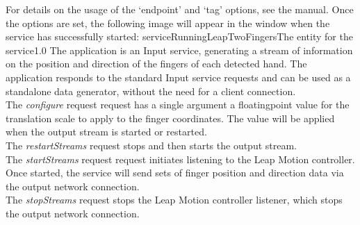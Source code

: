 For details on the usage of the `endpoint' and `tag' options, see the \emph{\MMMU} manual.
Once the options are set, the following image will appear in the \emph{\MMMU} window when
the service has successfully started:
%
{serviceRunningLeapTwoFingers}{The \emph{\MMMU} entity for the \emph{\LTFI} service}{1.0}
\secondaryEnd
\primaryEnd{}
The  application is an Input service,
generating a stream of information on the position and direction of the fingers of each
detected hand.
The application responds to the standard Input service requests and can be used as a
standalone data generator, without the need for a client connection.\\

The \emph{configure} request request has a single argument \longDash{} a
floating\longDash{}point value for the translation scale to apply to the finger
coordinates.
The value will be applied when the output stream is started or restarted.\\ 

The \emph{restartStreams} request stops and then starts the output stream.\\

The \emph{startStreams} request request initiates listening to the Leap Motion controller.
Once started, the service will send sets of finger position and direction data via the
output \yarp{} network connection.\\

The \emph{stopStreams} request stops the Leap Motion controller listener, which stops the
output \yarp{} network connection.\\ 

